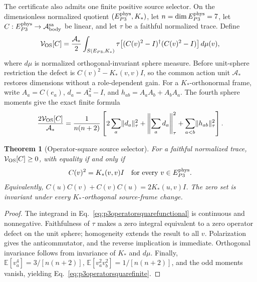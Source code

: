 \documentclass[11pt]{article}
\newtheorem{theorem}{Theorem}
\begin{document}
The certificate also admits one finite positive source selector.  On the
dimensionless normalized quotient $(E_{P3}^{\rm phys},K_*)$, let
$n=\dim E_{P3}^{\rm phys}=7$, let $C:E_{P3}^{\rm phys}\to
\mathcal A_{\rm body}^{\rm sa}$ be linear, and let $\tau$ be a faithful
normalized trace.  Define
\begin{equation}
 \mathcal V_{\rm OS}[C]
 = {\mathcal A_*\over2}
 \int_{S(E_{P3},K_*)}
 \tau\!\left[
 (C(v)^2-I)^\dagger(C(v)^2-I)
 \right]d\mu(v),
 \label{eq:p3operatorsquarefunctional}
\end{equation}
where $d\mu$ is normalized orthogonal-invariant sphere measure.  Before
unit-sphere restriction the defect is $C(v)^2-K_*(v,v)I$, so the common
action unit $\mathcal A_*$ restores dimensions without a role-dependent gain.
For a $K_*$-orthonormal frame, write $A_a=C(e_a)$,
$d_a=A_a^2-I$, and $h_{ab}=A_aA_b+A_bA_a$.  The fourth sphere moments give
the exact finite formula
\begin{equation}
 {2\mathcal V_{\rm OS}[C]\over\mathcal A_*}
 ={1\over n(n+2)}\left[
 2\sum_a\lVert d_a\rVert_\tau^2
 +\left\lVert\sum_a d_a\right\rVert_\tau^2
 +\sum_{a<b}\lVert h_{ab}\rVert_\tau^2
 \right].
 \label{eq:p3operatorsquarefinite}
\end{equation}

\begin{theorem}[Operator-square source selector]
\label{thm:p3operatorsquareselector}
For a faithful normalized trace,
$\mathcal V_{\rm OS}[C]\geq0$, with equality if and only if
\begin{equation}
 C(v)^2=K_*(v,v)I
 \quad\hbox{for every }v\in E_{P3}^{\rm phys}.
 \label{eq:p3operatorsquarezero}
\end{equation}
Equivalently,
$C(u)C(v)+C(v)C(u)=2K_*(u,v)I$.  The zero set is invariant under every
$K_*$-orthogonal source-frame change.
\end{theorem}

\begin{proof}
The integrand in Eq.~\eqref{eq:p3operatorsquarefunctional} is continuous and
nonnegative.  Faithfulness of $\tau$ makes a zero integral equivalent to a
zero operator defect on the unit sphere; homogeneity extends the result to
all $v$.  Polarization gives the anticommutator, and the reverse implication
is immediate.  Orthogonal invariance follows from invariance of $K_*$ and
$d\mu$.  Finally,
$\mathbb E[v_a^4]=3/[n(n+2)]$,
$\mathbb E[v_a^2v_b^2]=1/[n(n+2)]$, and the odd moments vanish, yielding
Eq.~\eqref{eq:p3operatorsquarefinite}.
\end{proof}
\end{document}
